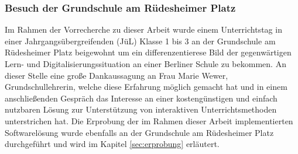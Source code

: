 \subsubsection{Besuch der Grundschule am Rüdesheimer Platz}
Im Rahmen der Vorrecherche zu dieser Arbeit wurde einem Unterrichtstag in 
einer Jahrgangsübergreifenden (JüL) Klasse 1 bis 3 an der Grundschule am Rüdesheimer Platz beigewohnt um ein differenzentierese 
Bild der gegenwärtigen Lern- und Digitalisierungssituation an einer Berliner Schule zu bekommen. An dieser Stelle eine große Dankaussagung an Frau Marie Wewer, Grundschullehrerin, welche diese Erfahrung möglich gemacht hat und in einem anschließenden Gespräch das Interesse an einer kostengünstigen und einfach nutzbaren Lösung zur Unterstützung von interaktiven Unterrichtsmethoden unterstrichen hat. Die Erprobung der im Rahmen dieser Arbeit implementierten Softwarelösung wurde ebenfalls an der Grundschule am Rüdesheimer Platz durchgeführt und wird im Kapitel \ref{sec:erprobung} erläutert.     
